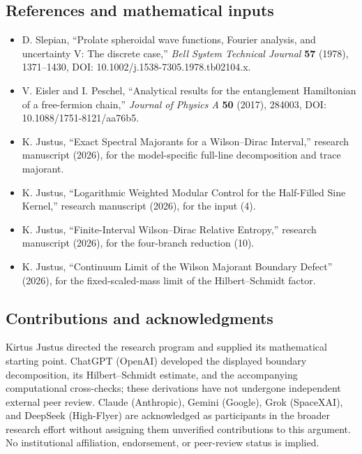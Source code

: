 \documentclass[
  10pt,
  a4paper,
]{article}
\providecommand{\tightlist}{%
  \setlength{\itemsep}{0pt}\setlength{\parskip}{0pt}}
\begin{document}
\subsection{References and mathematical inputs}\label{references-and-mathematical-inputs}

\begin{itemize}
\tightlist
\item
  D. Slepian, ``Prolate spheroidal wave functions, Fourier analysis, and uncertainty V: The discrete case,'' \emph{Bell System Technical Journal} \textbf{57} (1978), 1371--1430, DOI: 10.1002/j.1538-7305.1978.tb02104.x.
\item
  V. Eisler and I. Peschel, ``Analytical results for the entanglement Hamiltonian of a free-fermion chain,'' \emph{Journal of Physics A} \textbf{50} (2017), 284003, DOI: 10.1088/1751-8121/aa76b5.
\item
  K. Justus, ``Exact Spectral Majorants for a Wilson--Dirac Interval,'' research manuscript (2026), for the model-specific full-line decomposition and trace majorant.
\item
  K. Justus, ``Logarithmic Weighted Modular Control for the Half-Filled Sine Kernel,'' research manuscript (2026), for the input (4).
\item
  K. Justus, ``Finite-Interval Wilson--Dirac Relative Entropy,'' research manuscript (2026), for the four-branch reduction (10).
\item
  K. Justus, ``Continuum Limit of the Wilson Majorant Boundary Defect'' (2026), for the fixed-scaled-mass limit of the Hilbert--Schmidt factor.
\end{itemize}

\subsection{Contributions and acknowledgments}\label{contributions-and-acknowledgments}

Kirtus Justus directed the research program and supplied its mathematical starting point. ChatGPT (OpenAI) developed the displayed boundary decomposition, its Hilbert--Schmidt estimate, and the accompanying computational cross-checks; these derivations have not undergone independent external peer review. Claude (Anthropic), Gemini (Google), Grok (SpaceXAI), and DeepSeek (High-Flyer) are acknowledged as participants in the broader research effort without assigning them unverified contributions to this argument. No institutional affiliation, endorsement, or peer-review status is implied.
\end{document}
